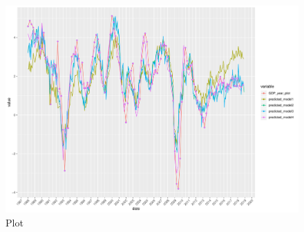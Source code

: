 \documentclass[12pt,a4paper,oneside]{book}
\begin{document}
\begin{figure}[H]
    \centering
    \captionsetup{justification=centering}
    \includegraphics[scale=0.5]{Graphs/pred2.pdf}
    \caption{Plot }
    \label{pred2}
\end{figure}


\newpage
\end{document}
